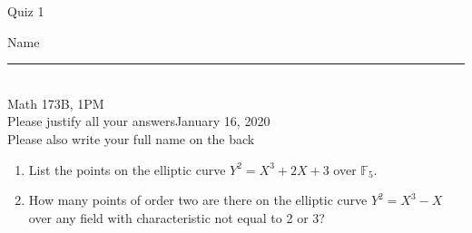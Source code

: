 \documentclass[12pt]{article}
\newcommand{\field}{\mathbb{F}}
\begin{document}
\begin{flushleft} 
\centerline{\LARGE{Quiz 1}} 
\vspace{5 mm}
{Name \rule {2 in}{0.01in}}\\
Math 173B, 1PM
\\
{Please justify all your answers}\hfill {January 16, 2020}
\\
{Please also write your full name on the back} 

\medskip
\end{flushleft}

\begin{enumerate}
	\item List the points on the elliptic curve $Y^2 = X^3 + 2X + 3$ over $\field_5$.
	\vfill

	\item How many points of order two are there on the elliptic curve $Y^2 = X^3 - X$ over any field with characteristic not equal to 2 or 3?
	\vfill
\end{enumerate}
\end{document}
